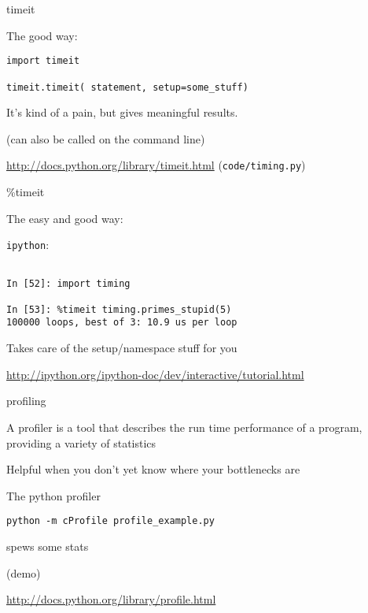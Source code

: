 \documentclass{beamer}
\begin{document}
\begin{frame}[fragile]{timeit}

{\Large The good way:}

\begin{verbatim}
import timeit

timeit.timeit( statement, setup=some_stuff)

\end{verbatim}

{\Large It's kind of a pain, but gives meaningful results.}

(can also be called on the command line)

\vfill
\url{http://docs.python.org/library/timeit.html}
\vfill
(\verb|code/timing.py|)
\end{frame} 

\begin{frame}[fragile]{\%timeit}

{\Large The easy and good way:}

\vfill
{\LARGE \verb|ipython|:}
\begin{verbatim}

In [52]: import timing

In [53]: %timeit timing.primes_stupid(5)
100000 loops, best of 3: 10.9 us per loop

\end{verbatim}

{\Large Takes care of the setup/namespace stuff for you}

\vfill
\url{http://ipython.org/ipython-doc/dev/interactive/tutorial.html}
\end{frame} 


\begin{frame}[fragile]{profiling}

{\Large A profiler is a tool that describes the run time performance of a
program, providing a variety of statistics}

\vfill
{\Large Helpful when you don't yet know where your bottlenecks are}

\vfill
{\Large The python profiler}

\begin{verbatim}
python -m cProfile profile_example.py  
\end{verbatim}
{\Large spews some stats}

(demo)

\vfill
\url{http://docs.python.org/library/profile.html}
\end{frame} 
\end{document}
